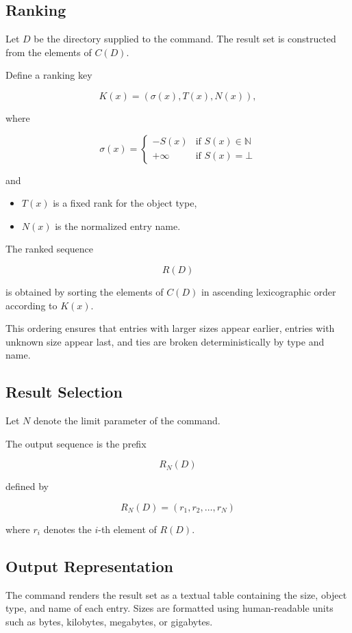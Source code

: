 \subsection{Ranking}

Let \(D\) be the directory supplied to the command. The result set is constructed from the elements of \(C(D)\).

Define a ranking key

\[
K(x) = (\sigma(x), T(x), N(x)),
\]

where

\[
\sigma(x) =
\begin{cases}
-S(x) & \text{if } S(x) \in \mathbb{N} \\
+\infty & \text{if } S(x) = \bot
\end{cases}
\]

and

\begin{itemize}
\item \(T(x)\) is a fixed rank for the object type,
\item \(N(x)\) is the normalized entry name.
\end{itemize}

The ranked sequence

\[
R(D)
\]

is obtained by sorting the elements of \(C(D)\) in ascending lexicographic order according to \(K(x)\).

This ordering ensures that entries with larger sizes appear earlier, entries with unknown size appear last, and ties are broken deterministically by type and name.

\subsection{Result Selection}

Let \(N\) denote the limit parameter of the command.

The output sequence is the prefix

\[
R_N(D)
\]

defined by

\[
R_N(D) = (r_1, r_2, \dots, r_N)
\]

where \(r_i\) denotes the \(i\)-th element of \(R(D)\).

\subsection{Output Representation}

The command renders the result set as a textual table containing the size, object type, and name of each entry. Sizes are formatted using human-readable units such as bytes, kilobytes, megabytes, or gigabytes.

